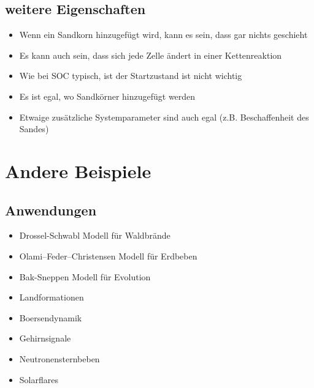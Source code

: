 \documentclass{beamer}
\begin{document}
\subsection{weitere Eigenschaften}
\begin{frame}[fragile]{\insertsection}{\insertsubsection}
    \begin{itemize}
        \item Wenn ein Sandkorn hinzugefügt wird, kann es sein, dass gar nichts geschieht
        \item Es kann auch sein, dass sich jede Zelle ändert in einer Kettenreaktion
        \item Wie bei SOC typisch, ist der Startzustand ist nicht wichtig
        \item Es ist egal, wo Sandkörner hinzugefügt werden
        \item Etwaige zusätzliche Systemparameter sind auch egal (z.B. Beschaffenheit des Sandes)
    \end{itemize}
\end{frame}

\section{Andere Beispiele}
\subsection{Anwendungen}
\begin{frame}{\insertsection}{\insertsubsection}
	\begin{itemize}
        \item Drossel-Schwabl Modell für Waldbrände
        \pause
        \item Olami–Feder–Christensen Modell für Erdbeben
        \item Bak-Sneppen Modell für Evolution
        \item Landformationen
        \item Boersendynamik
        \item Gehirnsignale
        \item Neutronensternbeben
        \item Solarflares
	\end{itemize}
\end{frame}
\end{document}
